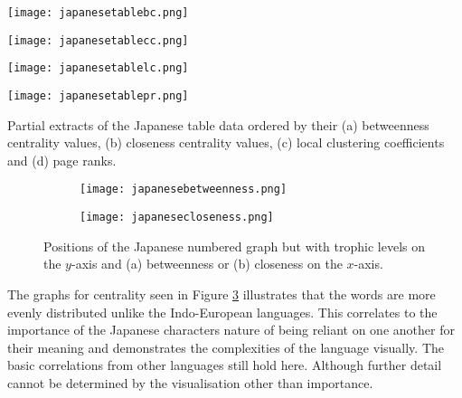 \begin{table}[!htb]
\centering
\begin{subtable}{.2\textwidth}
	\centering
	\texttt{[image: japanesetablebc.png]}
	\caption{}
	\label{table:japanesetablebc}
\end{subtable}
\hfill
\begin{subtable}{.2\textwidth}
	\centering
	\texttt{[image: japanesetablecc.png]}
	\caption{}
	\label{table:japanesetablecc}
\end{subtable}
\hfill
\begin{subtable}{.2\textwidth}
	\centering
	\texttt{[image: japanesetablelc.png]}
	\caption{}
	\label{table:japanesetablelc}
\end{subtable}
\hfill
\begin{subtable}{.2\textwidth}
	\centering
	\texttt{[image: japanesetablepr.png]}
	\caption{}
	\label{table:japanesetablepr}
\end{subtable}
\caption{Partial extracts of the Japanese table data ordered by their (a) betweenness centrality values, (b) closeness centrality values, (c) local clustering coefficients and (d) page ranks.}
\label{table:japanesedatar}
\end{table}

\begin{figure}[!htb]
\centering
\begin{subfigure}{.45\textwidth}
	\hspace{-1cm} 
	\texttt{[image: japanesebetweenness.png]}
	\caption{}
	\label{fig:jpbc}
\end{subfigure}
\hfill
\begin{subfigure}{.45\textwidth}
	\hspace{-1cm} 
	\texttt{[image: japanesecloseness.png]}
	\caption{ }
	\label{fig:jpcc}
\end{subfigure}
\caption{Positions of the Japanese numbered graph but with trophic levels on the $y$-axis and (a) betweenness or (b) closeness on the $x$-axis.}
\label{fig:jpcentrality}
\end{figure}

The graphs for centrality seen in Figure \ref{fig:jpcentrality} illustrates that the words are more evenly distributed unlike the Indo-European languages. This correlates to the importance of the Japanese characters nature of being reliant on one another for their meaning and demonstrates the complexities of the language visually. The basic correlations from other languages still hold here. Although further detail cannot be determined by the visualisation other than importance. 

